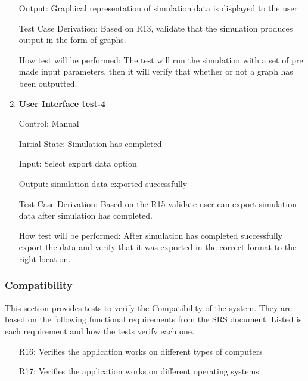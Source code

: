 \documentclass[12pt, titlepage]{article}
\begin{document}
\begin{enumerate}
  Output: Graphical representation of simulation data is displayed to the user
  
  Test Case Derivation: Based on R13, validate that the simulation produces output in the form of graphs.
  
  How test will be performed: The test will run the simulation with a set of pre made input parameters, then it will verify that whether or not a graph has been outputted. 
  \item {} \hypertarget{User Interface test-4}{\textbf{User Interface test-4}} \label{User Interface test-4}
  
  Control: Manual
            
  Initial State: Simulation has completed
            
  Input: Select export data option
            
  Output: simulation data exported successfully
  
  Test Case Derivation: Based on the R15 validate user can export simulation data after simulation has completed.
  
  How test will be performed: After simulation has completed successfully export the data and verify that it was exported in the correct format to the right location.

\end{enumerate}

  \subsubsection{Compatibility}

  This section provides tests to verify the Compatibility of the system.
They are based on the following functional requirements from the SRS document.
Listed is each requirement and how the tests verify each one.
\begin{itemize}
  \item [R16:] Verifies the application works on different types of computers
  \item [R17:] Verifies the application works on different operating systems
\end{itemize}
\end{document}
